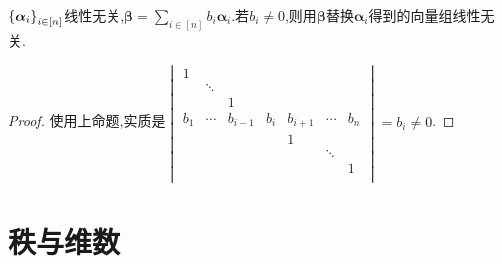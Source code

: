 \documentclass[openany]{book}
\begin{document}
\begin{proposition}
    $\left\{\bm{\alpha}_i\right\}_{i\in[n]}$线性无关,$\bm{\beta}=\sum_{i\in [n]}b_i\bm{\alpha}_i$.若$b_i\neq 0$,则用$\bm{\beta}$替换$\bm{\alpha}_i$得到的向量组线性无关.
\end{proposition}
\begin{proof}
    使用上命题,实质是$\begin{vmatrix}
        1 &   &   &   &   &   & \\
        & \ddots &   &   &   &   &  \\
        &   & 1 &   &   &   &   \\
        b_1 & \cdots & b_{i-1} & b_i & b_{i+1} & \cdots & b_n \\
        &   &   &   & 1 &   &   \\
        &   &   &   &   & \ddots &   \\
        &   &   &   &   &   & 1 \\
    \end{vmatrix}=b_i\neq 0$.
\end{proof}

\section{秩与维数}
\end{document}

